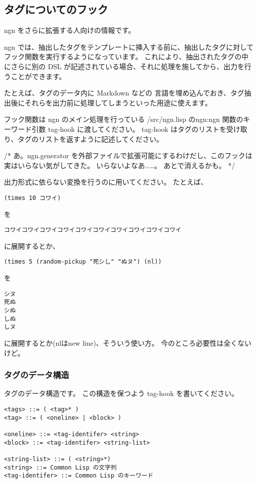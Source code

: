 \documentclass[a4j]{jsarticle}
\begin{document}
\subsection{タグについてのフック}
ngn をさらに拡張する人向けの情報です。

ngn では、抽出したタグをテンプレートに挿入する前に、抽出したタグに対してフック関数を実行するようになっています。
これにより、抽出されたタグの中にさらに別の DSL が記述されている場合、それに処理を施してから、出力を行うことができます。

たとえば、タグのデータ内に Markdown などの 言語を埋め込んでおき、タグ抽出後にそれらを出力前に処理してしまうといった用途に使えます。

フック関数は ngn のメイン処理を行っている /src/ngn.lisp のngn:ngn 関数のキーワード引数 tag-hook に渡してください。
tag-hook はタグのリストを受け取り、タグのリストを返すように記述してください。

/* 
あ。ngn.generator を外部ファイルで拡張可能にするわけだし、このフックは実はいらない気がしてきた。
いらないよなあ……。
あとで消えるかも。
 */

出力形式に依らない変換を行うのに用いてください。
たとえば、
\begin{lstlisting}
(times 10 コワイ)
\end{lstlisting}
を
\begin{lstlisting}
コワイコワイコワイコワイコワイコワイコワイコワイコワイコワイ
\end{lstlisting}
に展開するとか、
\begin{lstlisting}
(times 5 (random-pickup "死シし" "ぬヌ") (nl))
\end{lstlisting}
を
\begin{lstlisting}
シヌ
死ぬ
シぬ
しぬ
しヌ
\end{lstlisting}
に展開するとか(nlはnew line)、そういう使い方。
今のところ必要性は全くないけど。


\subsubsection{タグのデータ構造}
タグのデータ構造です。
この構造を保つよう tag-hook を書いてください。

\begin{lstlisting}[caption=タグのデータ構造]
<tags> ::= ( <tag>* )
<tag> ::= ( <oneline> | <block> )

<oneline> ::= <tag-identifer> <string>
<block> ::= <tag-identifer> <string-list>

<string-list> ::= ( <string>*)
<string> ::= Common Lisp の文字列
<tag-identifer> ::= Common Lisp のキーワード

\end{lstlisting}
\end{document}
